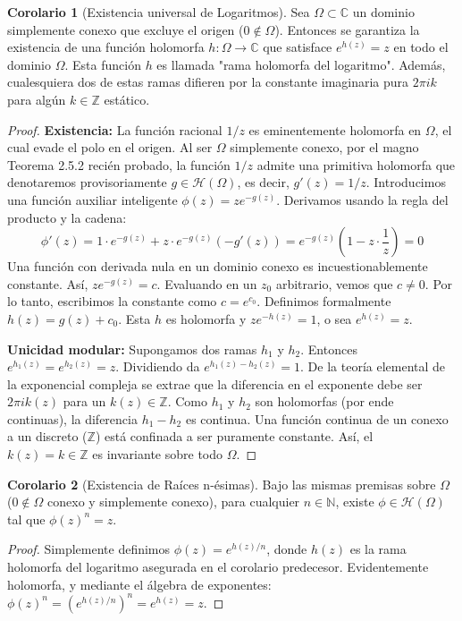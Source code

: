 \documentclass[11pt,a4paper]{article}
\theoremstyle{definition}
\newtheorem{corolario}{Corolario}[section]
\theoremstyle{remark}
\numberwithin{equation}{section}
\begin{document}
\begin{corolario}[Existencia universal de Logaritmos]
Sea $\Omega \subset \mathbb{C}$ un dominio simplemente conexo que excluye el origen ($0 \notin \Omega$). Entonces se garantiza la existencia de una función holomorfa $h: \Omega \to \mathbb{C}$ que satisface $e^{h(z)} = z$ en todo el dominio $\Omega$. Esta función $h$ es llamada "rama holomorfa del logaritmo". Además, cualesquiera dos de estas ramas difieren por la constante imaginaria pura $2\pi i k$ para algún $k \in \mathbb{Z}$ estático.
\end{corolario}
\begin{proof}
\textbf{Existencia:} La función racional $1/z$ es eminentemente holomorfa en $\Omega$, el cual evade el polo en el origen. Al ser $\Omega$ simplemente conexo, por el magno Teorema 2.5.2 recién probado, la función $1/z$ admite una primitiva holomorfa que denotaremos provisoriamente $g \in \mathcal{H}(\Omega)$, es decir, $g'(z) = 1/z$.
Introducimos una función auxiliar inteligente $\phi(z) = z e^{-g(z)}$. Derivamos usando la regla del producto y la cadena:
$$ \phi'(z) = 1 \cdot e^{-g(z)} + z \cdot e^{-g(z)}(-g'(z)) = e^{-g(z)}(1 - z \cdot \frac{1}{z}) = 0 $$
Una función con derivada nula en un dominio conexo es incuestionablemente constante. Así, $z e^{-g(z)} = c$. Evaluando en un $z_0$ arbitrario, vemos que $c \neq 0$. Por lo tanto, escribimos la constante como $c = e^{c_0}$. Definimos formalmente $h(z) = g(z) + c_0$. Esta $h$ es holomorfa y $z e^{-h(z)} = 1$, o sea $e^{h(z)} = z$.

\textbf{Unicidad modular:} Supongamos dos ramas $h_1$ y $h_2$. Entonces $e^{h_1(z)} = e^{h_2(z)} = z$. Dividiendo da $e^{h_1(z) - h_2(z)} = 1$. De la teoría elemental de la exponencial compleja se extrae que la diferencia en el exponente debe ser $2\pi i k(z)$ para un $k(z) \in \mathbb{Z}$. 
Como $h_1$ y $h_2$ son holomorfas (por ende continuas), la diferencia $h_1 - h_2$ es continua. Una función continua de un conexo a un discreto ($\mathbb{Z}$) está confinada a ser puramente constante. Así, el $k(z) = k \in \mathbb{Z}$ es invariante sobre todo $\Omega$.
\end{proof}

\begin{corolario}[Existencia de Raíces n-ésimas]
Bajo las mismas premisas sobre $\Omega$ ($0 \notin \Omega$ conexo y simplemente conexo), para cualquier $n \in \mathbb{N}$, existe $\phi \in \mathcal{H}(\Omega)$ tal que $\phi(z)^n = z$.
\end{corolario}
\begin{proof}
Simplemente definimos $\phi(z) = e^{h(z)/n}$, donde $h(z)$ es la rama holomorfa del logaritmo asegurada en el corolario predecesor. Evidentemente holomorfa, y mediante el álgebra de exponentes: $\phi(z)^n = (e^{h(z)/n})^n = e^{h(z)} = z$.
\end{proof}
\end{document}
